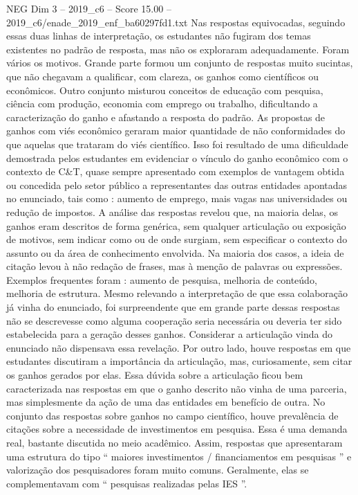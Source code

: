 \begin{textsample}{NEG Dim 3 – 2019\_c6 – Score 15.00 – 2019\_c6/enade\_2019\_enf\_ba60297fd1.txt}
Nas respostas equivocadas, seguindo essas duas linhas de interpretação, os estudantes não fugiram dos temas existentes no padrão de resposta, mas não os exploraram adequadamente.
Foram vários os motivos.
Grande parte formou um conjunto de respostas muito sucintas, que não chegavam a qualificar, com clareza, os ganhos como científicos ou econômicos.
Outro conjunto misturou conceitos de educação com pesquisa, ciência com produção, economia com emprego ou trabalho, dificultando a caracterização do ganho e afastando a resposta do padrão.
As propostas de ganhos com viés econômico geraram maior quantidade de não conformidades do que aquelas que trataram do viés científico.
Isso foi resultado de uma dificuldade demostrada pelos estudantes em evidenciar o vínculo do ganho econômico com o contexto de C\&T, quase sempre apresentado com exemplos de vantagem obtida ou concedida pelo setor público a representantes das outras entidades apontadas no enunciado, tais como : aumento de emprego, mais vagas nas universidades ou redução de impostos.
A análise das respostas revelou que, na maioria delas, os ganhos eram descritos de forma genérica, sem qualquer articulação ou exposição de motivos, sem indicar como ou de onde surgiam, sem especificar o contexto do assunto ou da área de conhecimento envolvida.
Na maioria dos casos, a ideia de citação levou à não redação de frases, mas à menção de palavras ou expressões.
Exemplos frequentes foram : aumento de pesquisa, melhoria de conteúdo, melhoria de estrutura.
Mesmo relevando a interpretação de que essa colaboração já vinha do enunciado, foi surpreendente que em grande parte dessas respostas não se descrevesse como alguma cooperação seria necessária ou deveria ter sido estabelecida para a geração desses ganhos.
Considerar a articulação vinda do enunciado não dispensava essa revelação.
Por outro lado, houve respostas em que estudantes discutiram a importância da articulação, mas, curiosamente, sem citar os ganhos gerados por elas.
Essa dúvida sobre a articulação ficou bem caracterizada nas respostas em que o ganho descrito não vinha de uma parceria, mas simplesmente da ação de uma das entidades em benefício de outra.
No conjunto das respostas sobre ganhos no campo científico, houve prevalência de citações sobre a necessidade de investimentos em pesquisa.
Essa é uma demanda real, bastante discutida no meio acadêmico.
Assim, respostas que apresentaram uma estrutura do tipo “ maiores investimentos / financiamentos em pesquisas ” e valorização dos pesquisadores foram muito comuns.
Geralmente, elas se complementavam com “ pesquisas realizadas pelas IES ”.

\end{textsample}
